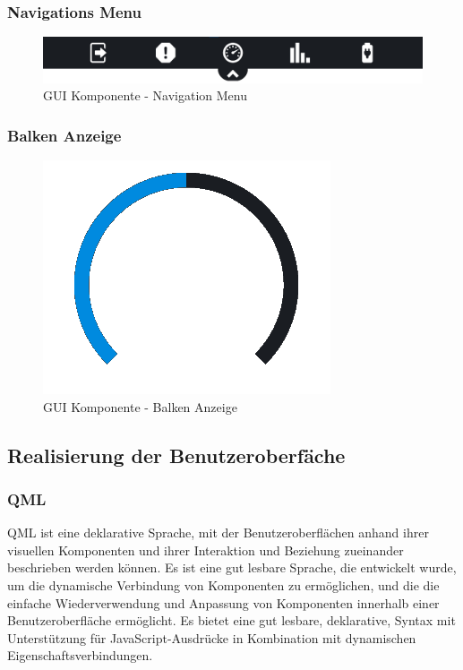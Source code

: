 \subsubsection{Navigations Menu}

\begin{figure}[H]
	\begin{center}
		\includegraphics[scale=0.2]{figures/hcis/component_menu.png}
		\caption{GUI Komponente - Navigation Menu}
	\end{center}
\end{figure}

\subsubsection{Balken Anzeige}

\begin{figure}[H]
	\begin{center}
		\includegraphics[scale=0.4]{figures/hcis/component_bar.png}
		\caption{GUI Komponente - Balken Anzeige}
	\end{center}
\end{figure}

\newpage

\subsection{Realisierung der Benutzeroberfäche}

\subsubsection{QML}
QML ist eine deklarative Sprache, mit der Benutzeroberflächen anhand ihrer visuellen Komponenten und ihrer Interaktion und Beziehung zueinander beschrieben werden können. Es ist eine gut lesbare Sprache, die entwickelt wurde, um die dynamische Verbindung von Komponenten zu ermöglichen, und die die einfache Wiederverwendung und Anpassung von Komponenten innerhalb einer Benutzeroberfläche ermöglicht. Es bietet eine gut lesbare, deklarative, Syntax mit Unterstützung für JavaScript-Ausdrücke in Kombination mit dynamischen Eigenschaftsverbindungen.

